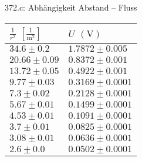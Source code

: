 \documentclass[a4paper,12pt]{article}
\begin{document}
\noindent 372.c: Abhängigkeit Abstand -- Fluss\\
\begin{tabular}{ ll }
        $\tfrac{1}{r^2}$ $\left[\tfrac{1}{\text{m}^2}\right]$ & $U$ $\left(\text{V}\right)$ \\
	\hline
        $34.6 \pm 0.2$ & $1.7872 \pm 0.005$\\
        $20.66 \pm 0.09$ & $0.8372 \pm 0.001$ \\
        $13.72 \pm 0.05$ & $0.4922 \pm 0.001$ \\
        $9.77 \pm 0.03$ & $0.3169 \pm 0.0001$ \\
        $7.3 \pm 0.02$ & $0.2128 \pm 0.0001$ \\
        $5.67 \pm 0.01$ & $0.1499 \pm 0.0001$ \\
        $4.53 \pm 0.01$ & $0.1091 \pm 0.0001$ \\
        $3.7 \pm 0.01$ & $0.0825 \pm 0.0001$ \\
        $3.08 \pm 0.01$ & $0.0636 \pm 0.0001$ \\
        $2.6 \pm 0.0$ & $0.0502 \pm 0.0001$
\end{tabular}
\end{document}
